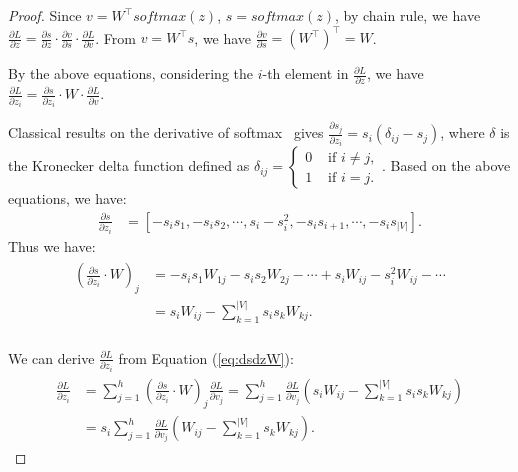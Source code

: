 \begin{proof}
Since $v=W^\top softmax(z)$, $s=softmax(z)$, 
by chain rule, we have $  \frac{\partial L}{\partial z}= \frac{\partial s}{\partial z}\cdot \frac{\partial v}{\partial s}\cdot \frac{\partial L}{\partial v}$.
 From $v=W^\top s$, we have $\frac{\partial v}{\partial s}={(W^\top)}^\top=W$.
 
By the above equations, considering the $i$-th element in $\frac{\partial L}{\partial z}$, we have $    \frac{\partial L}{\partial z_i}=  \frac{\partial s}{\partial z_i} \cdot W\cdot \frac{\partial L}{\partial v}$.

Classical results on the derivative of softmax~\cite{gao2017properties,elfadel1993softmax} gives $\frac{\partial s_j}{\partial z_i}=s_i (\delta_{ij}-s_j)$, 
where $\delta$ is the Kronecker delta function defined as $
    \delta_{i j}= \begin{cases}0 & \text { if } i \neq j, \\ 1 & \text { if } i=j.\end{cases} $. Based on the above equations, we have:\\
\begin{align}
    \frac{\partial s}{\partial z_i}&=[-s_i s_1, -s_i s_2, \cdots , s_i-s_i^2,-s_i s_{i+1},\cdots,-s_i s_{|V|}] .
\end{align}
Thus we have:\\
\begin{align}
\label{eq:dsdzW}
\begin{aligned}
    (\frac{\partial s}{\partial z_i} \cdot W)_j&=-s_i s_1 W_{1j}-s_i s_2 W_{2j}-\cdots+s_i W_{ij}-s_i^2 W_{ij}-\cdots \\
    &=s_i W_{ij}- \sum_{k=1}^{|V|} s_i s_k W_{kj}.\\
\end{aligned}
\end{align}

We can derive $\frac{\partial L}{\partial z_i}$ from Equation (\ref{eq:dsdzW}):\\
\begin{align}
\label{eq:dLdz}
\begin{aligned}
\frac{\partial L}{\partial z_i}&=\sum_{j=1}^h (\frac{\partial s}{\partial z_i} \cdot W)_j \frac{\partial L}{\partial v_j}=\sum_{j=1}^h \frac{\partial L}{\partial v_j} (s_i W_{ij}- \sum_{k=1}^{|V|} s_i s_k W_{kj})\\
&=s_i\sum_{j=1}^h \frac{\partial L}{\partial v_j} ( W_{ij}- \sum_{k=1}^{|V|}  s_k W_{kj}).
\end{aligned}
\end{align}


\end{proof}
